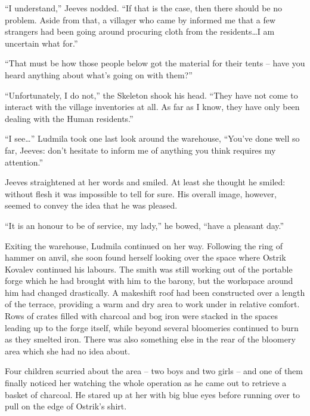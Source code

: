  

“I understand,” Jeeves nodded. “If that is the case, then there should be no problem. Aside from that, a villager who came by informed me that a few strangers had been going around procuring cloth from the residents…I am uncertain what for.”

 

“That must be how those people below got the material for their tents – have you heard anything about what’s going on with them?”

 

“Unfortunately, I do not,” the Skeleton shook his head. “They have not come to interact with the village inventories at all. As far as I know, they have only been dealing with the Human residents.”

 

“I see…” Ludmila took one last look around the warehouse, “You’ve done well so far, Jeeves: don’t hesitate to inform me of anything you think requires my attention.”

 

Jeeves straightened at her words and smiled. At least she thought he smiled: without flesh it was impossible to tell for sure. His overall image, however, seemed to convey the idea that he was pleased.

 

“It is an honour to be of service, my lady,” he bowed, “have a pleasant day.”

 

Exiting the warehouse, Ludmila continued on her way. Following the ring of hammer on anvil, she soon found herself looking over the space where Ostrik Kovalev continued his labours. The smith was still working out of the portable forge which he had brought with him to the barony, but the workspace around him had changed drastically. A makeshift roof had been constructed over a length of the terrace, providing a warm and dry area to work under in relative comfort. Rows of crates filled with charcoal and bog iron were stacked in the spaces leading up to the forge itself, while beyond several bloomeries continued to burn as they smelted iron. There was also something else in the rear of the bloomery area which she had no idea about.

 

Four children scurried about the area – two boys and two girls – and one of them finally noticed her watching the whole operation as he came out to retrieve a basket of charcoal. He stared up at her with big blue eyes before running over to pull on the edge of Ostrik’s shirt.

